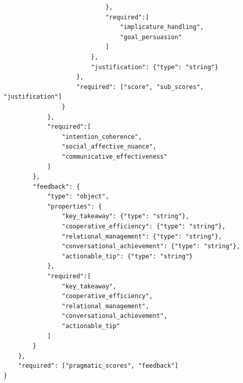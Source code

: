 \begin{verbatim}
                            },
                            "required":[
                                "implicature_handling", 
                                "goal_persuasion"
                            ]
                        },
                        "justification": {"type": "string"}
                    },
                    "required": ["score", "sub_scores", "justification"]
                }
            },
            "required":[
                "intention_coherence",
                "social_affective_nuance",
                "communicative_effectiveness"
            ]
        },
        "feedback": {
            "type": "object",
            "properties": {
                "key_takeaway": {"type": "string"},
                "cooperative_efficiency": {"type": "string"},
                "relational_management": {"type": "string"},
                "conversational_achievement": {"type": "string"},
                "actionable_tip": {"type": "string"}
            },
            "required":[
                "key_takeaway",
                "cooperative_efficiency",
                "relational_management",
                "conversational_achievement",
                "actionable_tip"
            ]
        }
    },
    "required": ["pragmatic_scores", "feedback"]
}
\end{verbatim}
